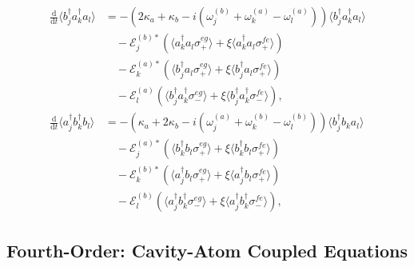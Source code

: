 \documentclass{article}
\newcommand{\ddt}[1][]{\frac{\mathrm{d} #1}{\mathrm{d}t}}
\begin{document}
\begin{subequations}
	\begin{align}
		\ddt \langle b^{\dagger}_{j} a^{\dagger}_{k} a_{l} \rangle &= -\left( 2\kappa_{a} + \kappa_{b} - i \left( \omega_{j}^{(b)} + \omega_{k}^{(a)} - \omega_{l}^{(a)} \right) \right) \langle b^{\dagger}_{j} a^{\dagger}_{k} a_{l} \rangle \nonumber \\
		&\quad - \mathcal{E}_{j}^{(b) *} \left( \langle a^{\dagger}_{k} a_{l} \sigma^{eg}_{+} \rangle + \xi \langle a^{\dagger}_{k} a_{l} \sigma^{fe}_{+} \rangle \right) \nonumber \\
		&\quad - \mathcal{E}_{k}^{(a) *} \left( \langle b^{\dagger}_{j} a_{l} \sigma^{eg}_{+} \rangle + \xi \langle b^{\dagger}_{j} a_{l} \sigma^{fe}_{+} \rangle \right) \nonumber \\
		&\quad - \mathcal{E}_{l}^{(a)} \left( \langle b^{\dagger}_{j} a^{\dagger}_{k} \sigma^{eg}_{-} \rangle + \xi \langle b^{\dagger}_{j} a^{\dagger}_{k} \sigma^{fe}_{-} \rangle \right) ,\\
		\ddt \langle a^{\dagger}_{j} b^{\dagger}_{k} b_{l} \rangle &= -\left( \kappa_{a} + 2\kappa_{b} - i \left( \omega_{j}^{(a)} + \omega_{k}^{(b)} - \omega_{l}^{(b)} \right) \right) \langle b^{\dagger}_{j} b_{k} a_{l} \rangle \nonumber \\
		&\quad - \mathcal{E}_{j}^{(a) *} \left( \langle b^{\dagger}_{k} b_{l} \sigma^{eg}_{+} \rangle + \xi \langle b^{\dagger}_{k} b_{l} \sigma^{fe}_{+} \rangle \right) \nonumber \\
		&\quad - \mathcal{E}_{k}^{(b) *} \left( \langle a^{\dagger}_{j} b_{l} \sigma^{eg}_{+} \rangle + \xi \langle a^{\dagger}_{j} b_{l} \sigma^{fe}_{+} \rangle \right) \nonumber \\
		&\quad - \mathcal{E}_{l}^{(b)} \left( \langle a^{\dagger}_{j} b^{\dagger}_{k} \sigma^{eg}_{-} \rangle + \xi \langle a^{\dagger}_{j} b^{\dagger}_{k} \sigma^{fe}_{-} \rangle \right) ,
	\end{align}
\end{subequations}

\subsection{Fourth-Order: Cavity-Atom Coupled Equations}
\end{document}

